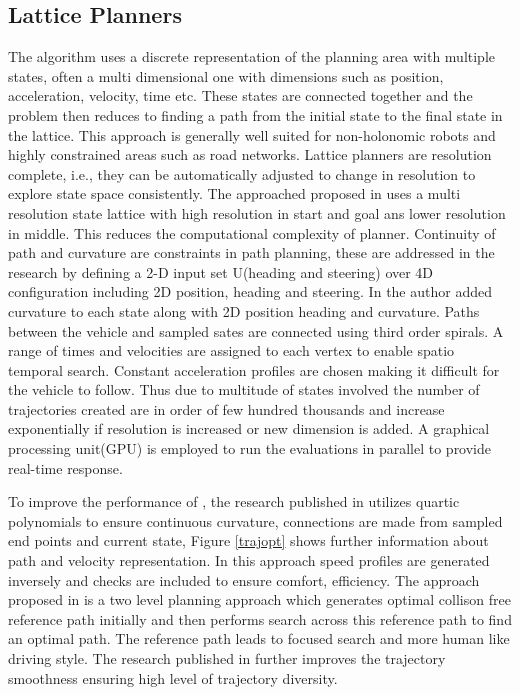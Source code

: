 \subsection{Lattice Planners}
\label{rw_lattice_planners}
The algorithm uses a discrete representation of the planning area with multiple states, often a multi dimensional one with dimensions such as position, acceleration, velocity, time etc. These states are connected together and the problem then reduces to finding a path from the initial state to the final state in the lattice. This approach is generally well suited for non-holonomic robots and highly constrained areas such as road networks\cite{lattice_1}. Lattice planners are resolution complete, i.e., they can be automatically adjusted to change in resolution to explore state space consistently. The approached proposed in \cite{lattice_1} uses a multi resolution state lattice with high resolution in start and goal ans lower resolution in middle. This reduces the computational complexity of planner. Continuity of path and curvature are constraints in path planning, these are addressed in the research \cite{lattice_2} by defining a 2-D input set U(heading and steering) over 4D configuration including 2D position, heading and steering. In \cite{cmu_parallel_thesis} the author added curvature to each state along with 2D position heading and curvature. Paths between the vehicle and sampled sates are connected using third order spirals. A range of times and velocities are assigned to each vertex to enable spatio temporal search. Constant acceleration profiles are chosen making it difficult for the vehicle to follow. Thus due to multitude of states involved the number of trajectories created are in order of few hundred thousands and increase exponentially if resolution is increased or new dimension is added. A graphical processing unit(GPU) is employed to run the evaluations in parallel to provide real-time response. 

To improve the performance of \cite{cmu_parallel_thesis}, the research published in \cite{traj_planner_optimization} utilizes quartic polynomials to ensure continuous curvature, connections are made from sampled end points and current state, Figure \ref{trajopt} shows further information about path and velocity representation. In this approach speed profiles are generated inversely and checks are included to ensure comfort, efficiency. The approach proposed in \cite{traj_smoothing} is a two level planning approach which generates optimal collison free reference path initially and then performs search across this reference path to find an optimal path. The reference path leads to focused search and more human like driving style. The research published in \cite{diss_shui_phd_thesis} further improves the trajectory smoothness ensuring high level of trajectory diversity. 

